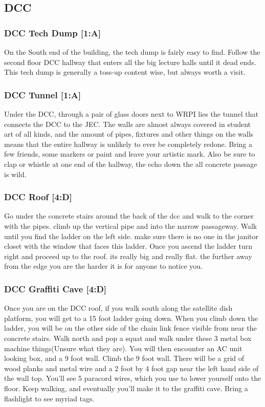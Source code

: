 \documentclass{article}
\begin{document}
\pagebreak
\subsection{DCC}
\subsubsection{DCC Tech Dump [1:A]}
On the South end of the building, the tech dump is fairly easy to find. Follow the second floor DCC hallway that enters all the big lecture halls until it dead ends. This tech dump is generally a toss-up content wise, but always worth a visit.
\subsubsection{DCC Tunnel [1:A]}
Under the DCC, through a pair of glass doors next to WRPI lies the tunnel that connects the DCC to the JEC. The walls are almost always covered in student art of all kinds, and the amount of pipes, fixtures and other things on the walls means that the entire hallway is unlikely to ever be completely redone. Bring a few friends, some markers or paint and leave your artistic mark. Also be sure to clap or whistle at one end of the hallway, the echo down the all concrete passage is wild.

 \subsubsection{DCC Roof [4:D]}
Go under the concrete stairs around the back of the dcc and walk to the corner with the pipes. climb up the vertical pipe and into the narrow passageway. Walk until you find the ladder on the left side. make sure there is no one in the janitor closet with the window that faces this ladder. Once you ascend the ladder turn right and proceed up to the roof. its really big and really flat. the further away from the edge you are the harder it is for anyone to notice you.
\subsubsection{DCC Graffiti Cave [4:D]}
Once you are on the DCC roof, if you walk south along the satellite dish platform, you will get to a 15 foot ladder going down. When you climb down the ladder, you will be on the other side of the chain link fence visible from near the concrete stairs. Walk north and pop a squat and walk under these 3 metal box machine things(Unsure what they are). You will then encounter an AC unit looking box, and a 9 foot wall. Climb the 9 foot wall. There will be a grid of wood planks and metal wire and a 2 foot by 4 foot gap near the left hand side of the wall top. You’ll see 5 paracord wires, which you use to lower yourself onto the floor. Keep walking, and eventually you’ll make it to the graffiti cave. Bring a flashlight to see myriad tags.
\end{document}
